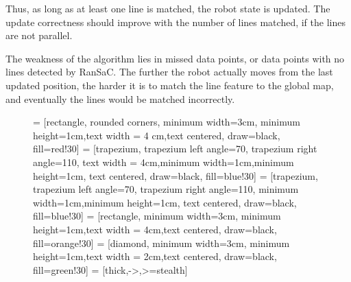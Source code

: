 Thus, as long as at least one line is matched, the robot state is updated.
The update correctness should improve with the number of lines matched, if the lines are not parallel.

The weakness of the algorithm lies in missed data points, or data points with no lines detected by RanSaC.
The further the robot actually moves from the last updated position, the harder it is to match the line
feature to the global map, and eventually the lines would be matched incorrectly.

\begin{figure}
  \centering
     = [rectangle, rounded corners, minimum width=3cm, minimum height=1cm,text width = 4 cm,text centered, draw=black, fill=red!30]
     = [trapezium, trapezium left angle=70, trapezium right angle=110, text width = 4cm,minimum width=1cm,minimum height=1cm, text centered, draw=black, fill=blue!30]
     = [trapezium, trapezium left angle=70, trapezium right angle=110, minimum width=1cm,minimum height=1cm, text centered, draw=black, fill=blue!30]
     = [rectangle, minimum width=3cm, minimum height=1cm,text width = 4cm,text centered, draw=black, fill=orange!30]
     = [diamond, minimum width=3cm, minimum height=1cm,text width = 2cm,text centered, draw=black, fill=green!30]    
     = [thick,->,>=stealth]

\end{figure}
